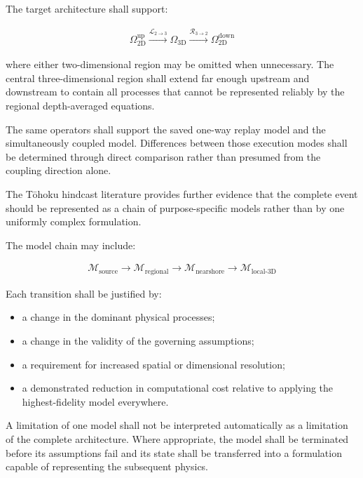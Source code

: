 The target architecture shall support:

\begin{align}
  \Omega_{\mathrm{2D}}^{\mathrm{up}}
  \xrightarrow{\mathcal{L}_{2\rightarrow3}}
  \Omega_{\mathrm{3D}}
  \xrightarrow{\mathcal{R}_{3\rightarrow2}}
  \Omega_{\mathrm{2D}}^{\mathrm{down}}
  \label{eq:res-mod-mul-complete-spatial-chain}
\end{align}

where either two-dimensional region may be omitted when unnecessary.
The central three-dimensional region shall extend far enough upstream
and downstream to contain all processes that cannot be represented
reliably by the regional depth-averaged equations.

The same operators shall support the saved one-way replay model and the
simultaneously coupled model. Differences between those execution modes
shall be determined through direct comparison rather than presumed from
the coupling direction alone.

The Tōhoku hindcast literature provides further evidence that the
complete event should be represented as a chain of purpose-specific
models rather than by one uniformly complex formulation.

The model chain may include:

\begin{align}
  \mathcal{M}_{\mathrm{source}}
  \rightarrow
  \mathcal{M}_{\mathrm{regional}}
  \rightarrow
  \mathcal{M}_{\mathrm{nearshore}}
  \rightarrow
  \mathcal{M}_{\mathrm{local\mbox{-}3D}}
  \label{eq:res-mod-mul-purpose-specific-chain}
\end{align}

Each transition shall be justified by:

\begin{itemize}
  \item a change in the dominant physical processes;
  \item a change in the validity of the governing assumptions;
  \item a requirement for increased spatial or dimensional
    resolution;
  \item a demonstrated reduction in computational cost relative to
    applying the highest-fidelity model everywhere.
\end{itemize}

A limitation of one model shall not be interpreted automatically as a
limitation of the complete architecture. Where appropriate, the model
shall be terminated before its assumptions fail and its state shall be
transferred into a formulation capable of representing the subsequent
physics.

